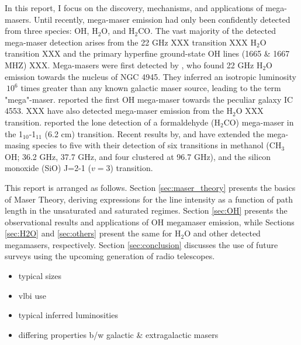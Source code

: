 In this report, I focus on the discovery, mechanisms, and applications of mega-masers. Until recently, mega-maser emission had only been confidently detected from three species: OH, H$_2$O, and H$_2$CO. The vast majority of the detected mega-maser detection arises from the 22 GHz XXX transition XXX H$_2$O transition XXX and the primary hyperfine ground-state OH lines (1665 \& 1667 MHZ) XXX. Mega-masers were first detected by \citet{DOS_SANTOS_1979}, who found 22 GHz H$_2$O emission towards the nucleus of NGC 4945. They inferred an isotropic luminosity $~10^6$ times greater than any known galactic maser source, leading to the term "mega"-maser. \citet{Baan_1982} reported the first OH mega-maser towards the peculiar galaxy IC 4553. XXX have also detected mega-maser emission from the H$_2$O XXX transition. \citet{baan1986} reported the lone detection of a formaldehyde (H$_2$CO) mega-maser in the 1$_{10}$-1$_{11}$ (6.2 cm) transition. Recent results by, \citet{wang2014} and \citet{chen2015} have extended the mega-masing species to five with their detection of six transitions in methanol (CH$_3$OH; 36.2 GHz, 37.7 GHz, and four clustered at 96.7 GHz), and the silicon monoxide (SiO) J=2-1  ($v=3$) transition. 

This report is arranged as follows. Section \ref{sec:maser_theory} presents the basics of Maser Theory, deriving expressions for the line intensity as a function of path length in the unsaturated and saturated regimes. Section \ref{sec:OH} presents the observational results and applications of OH megamaser emission, while Sections \ref{sec:H2O} and \ref{sec:others} present the same for H$_2$O and other detected megamasers, respectively. Section \ref{sec:conclusion} discusses the use of future surveys using the upcoming generation of radio telescopes.

\begin{itemize}
\item typical sizes
\item vlbi use
\item typical inferred luminosities
\item differing properties b/w galactic & extragalactic masers
\end{itemize}
